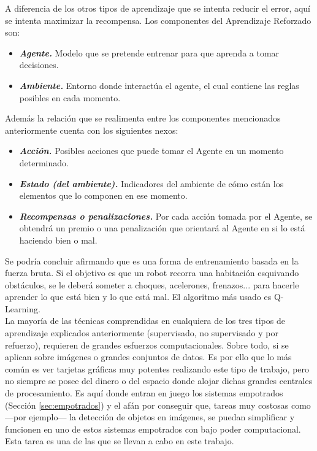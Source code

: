 A diferencia de los otros tipos de aprendizaje que se intenta reducir el error, aquí se intenta maximizar la recompensa. Los componentes del Aprendizaje Reforzado son:

\begin{itemize}
    \item \textit{\textbf{Agente.}} Modelo que se pretende entrenar para que aprenda a tomar decisiones.
    \item \textit{\textbf{Ambiente.}} Entorno donde interactúa el agente, el cual contiene las reglas posibles en cada momento.\\
\end{itemize}

Además la relación que se realimenta entre los componentes mencionados anteriormente cuenta con los siguientes nexos:

\begin{itemize}
    \item \textit{\textbf{Acción.}} Posibles acciones que puede tomar el Agente en un momento determinado.
    \item \textit{\textbf{Estado (del ambiente).}} Indicadores del ambiente de cómo están los elementos que lo componen en ese momento.
    \item \textit{\textbf{Recompensas o penalizaciones.}} Por cada acción tomada por el Agente, se obtendrá un premio o una penalización que orientará al Agente en si lo está haciendo bien o mal.
\end{itemize}

Se podría concluir afirmando que es una forma de entrenamiento basada en la fuerza bruta. Si el objetivo es que un robot recorra una habitación esquivando obstáculos, se le deberá someter a choques, acelerones, frenazos... para hacerle aprender lo que está bien y lo que está mal. El algoritmo más usado es Q-Learning.\\

La mayoría de las técnicas comprendidas en cualquiera de los tres tipos de aprendizaje explicados anteriormente (supervisado, no supervisado y por refuerzo), requieren de grandes esfuerzos computacionales. Sobre todo, si se aplican sobre imágenes o grandes conjuntos de datos. Es por ello que lo más común es ver tarjetas gráficas muy potentes realizando este tipo de trabajo, pero no siempre se posee del dinero o del espacio donde alojar dichas grandes centrales de procesamiento. Es aquí donde entran en juego los sistemas empotrados (Sección \ref{sec:empotrados}) y el afán por conseguir que, tareas muy costosas como ---por ejemplo--- la detección de objetos en imágenes, se puedan simplificar y funcionen en uno de estos sistemas empotrados con bajo poder computacional. Esta tarea es una de las que se llevan a cabo en este trabajo.


